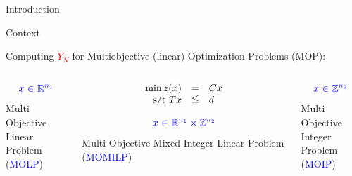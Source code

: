 \documentclass[10pt,xcolor=dvipsnames]{beamer}
\newcommand{\mR}{\mathbb{R}}
\newcommand{\mZ}{\mathbb{Z}}
\newcommand{\red}{\textcolor{red}}
\newcommand{\blue}{\textcolor{blue}}
\begin{document}
{%
\begin{frame}[standout]
Introduction
\end{frame}
}
\begin{frame}{Context}

\hspace{-3mm}Computing \red{$Y_N$} for Multiobjective (linear) Optimization Problems ({MOP}):


\begin{columns}
\begin{column}{0.33\textwidth}
\begin{center}
\vspace{4mm}
$$\blue{x} \ \blue{\in} \ \blue{\mR^{n_1}}\vspace{-2mm}$$
Multi Objective\\ Linear \\Problem (\blue{MOLP})
\end{center}
\end{column}
\begin{column}{0.33\textwidth}
$$
\begin{array}{rcl}
\min z(x) & = & {C}x\\
\hbox{s/t } Tx & \leqq & d
\end{array}
\vspace{-6mm}
$$
\begin{center}
$$\blue{x} \ \blue{\in} \ \blue{\mR^{n_1} \times \mZ^{n_2}}\vspace{-2mm}$$
Multi Objective Mixed-Integer Linear Problem (\blue{MOMILP})
\end{center}
\end{column}
\begin{column}{0.33\textwidth}
%
\begin{center}
\vspace{4mm}
$$\blue{x} \ \blue{\in} \ \blue{\mZ^{n_2}}\vspace{-2mm}$$
Multi Objective\\ Integer \\Problem (\blue{MOIP})
\end{center}
\end{column}
\end{columns}
\vspace{2mm}


\end{frame}
\end{document}
